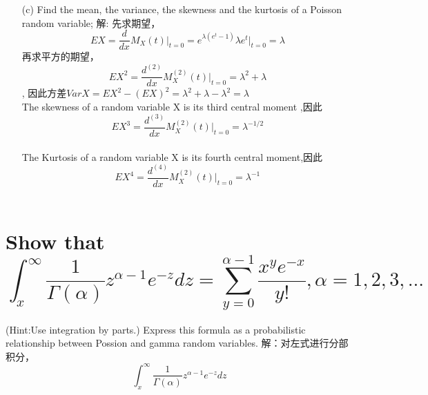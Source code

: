 \documentclass [12pt]{article}
\begin{document}
\begin{CJK*}{GBK}{kai}
\begin{enumerate}
	\item[(c)]	Find the mean, the variance, the skewness and the kurtosis of a Poisson random variable;
		 解: 先求期望，$$EX=\frac{d}{dx}M_{X}(t)\vert_{t=0}=e^{\lambda(e^t-1)}\lambda e^t \vert_{t=0}=\lambda$$
		 再求平方的期望，$$EX^2=\frac{d^{(2)}}{dx}M_{X}^{(2)}(t)\vert_{t=0}=\lambda^2+\lambda$$,
		因此方差$VarX=EX^2-(EX)^2 =\lambda^2+\lambda-\lambda^2=\lambda$\\
		The skewness of a random variable X is its third central moment ,因此$$EX^3=\frac{d^{(3)}}{dx}M_{X}^{(2)}(t)\vert_{t=0}=\lambda^{-1/2}$$\\
		The Kurtosis of a random variable X is its fourth central moment,因此$$EX^4=\frac{d^{(4)}}{dx}M_{X}^{(2)}(t)\vert_{t=0}=\lambda^{-1}$$\\
  \end{enumerate}

\section{Show that\\
     $$\int_{x}^{\infty}\frac{1}{\Gamma(\alpha)}z^{\alpha-1}e^{-z}dz=\sum_{y=0}^{\alpha-1}\frac{x^ye^{-x}}{y!},\alpha=1,2,3,...$$}
     (Hint:Use integration by parts.) Express this formula as a probabilistic relationship between Possion and gamma random variables.
	解：对左式进行分部积分， $$\int_{x}^{\infty}\frac{1}{\Gamma(\alpha)}z^{\alpha-1}e^{-z}dz$$
	$$$$
	


  \end{CJK*}
\end{document}
